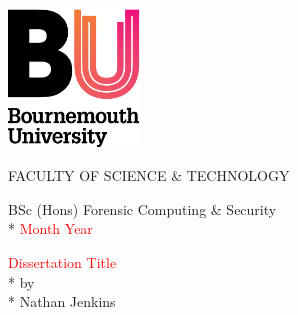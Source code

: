 
\begin{titlepage}
    \centering
{}

\vspace*{1em}\hspace*{-1cm}\includegraphics[width=3.5cm, left]{images/unilogo.png}

\begin{center}
\huge{FACULTY OF SCIENCE \& TECHNOLOGY}
\\
\normalsize\vspace{6em}

\LARGE{
BSc (Hons) Forensic Computing \& Security
}
\\*
\LARGE{
\lbrack\textcolor{red}{Month Year}\rbrack
}

\normalsize\vspace{6em}

\LARGE{
\lbrack\textcolor{red}{Dissertation Title}\rbrack
}
\\*
\normalsize\vspace{4em}
\LARGE{by}
\\*
\normalsize\vspace{4em}
\LARGE{
Nathan Jenkins
}

\end{center}
\end{titlepage}
\cleardoublepage




